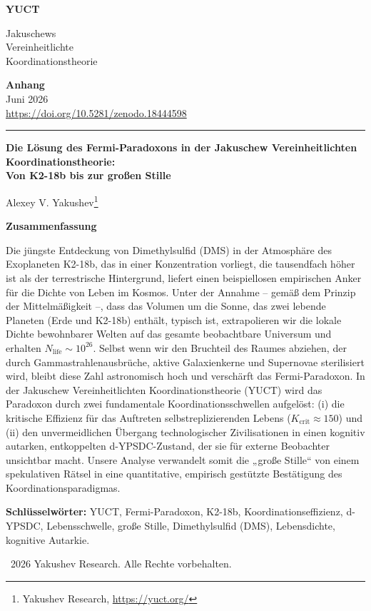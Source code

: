 \documentclass[11pt,a4paper]{article}
\newcommand{\makeheader}{%
	\noindent
	\begin{minipage}{0.17\textwidth}
		\raggedright
		{\sffamily\bfseries\color{skyblue}\fontsize{46}{46}\selectfont YUCT}%
	\end{minipage}%
	\hspace{30pt}
	\begin{minipage}{0.32\textwidth}
		\raggedright
		{\sffamily\fontsize{11}{13}\selectfont Jakuschews\\ Vereinheitlichte\\ Koordinationstheorie}%
	\end{minipage}%
	\hfill
	\begin{minipage}{0.38\textwidth}
		\raggedleft
		{\sffamily\bfseries Anhang}\\
		{\sffamily Juni 2026}\\
		{\sffamily\footnotesize \url{https://doi.org/10.5281/zenodo.18444598}}%
	\end{minipage}
	\par\vspace{5pt}
	\noindent\textcolor{gold}{\rule{\textwidth}{1.6pt}}
	\par\vspace{0pt}
}
\begin{document}
	\renewcommand{\thepage}{\arabic{page}}
	\thispagestyle{firstpage}
	\makeheader
	
	\vspace{0cm}
	{\LARGE\bfseries Die Lösung des Fermi-Paradoxons in der Jakuschew Vereinheitlichten Koordinationstheorie:\\ Von K2-18b bis zur großen Stille \par}
	\vspace{0.2cm}
	
	{\large Alexey V. Yakushev\footnote{Yakushev Research, \url{https://yuct.org/}}} \\
	\vspace{0.0cm}
	
	{\color{darkblue}\textbf{\LARGE Zusammenfassung}} \par
	{\large
		\noindent
		Die jüngste Entdeckung von Dimethylsulfid (DMS) in der Atmosphäre des Exoplaneten K2-18b, das in einer Konzentration vorliegt, die tausendfach höher ist als der terrestrische Hintergrund, liefert einen beispiellosen empirischen Anker für die Dichte von Leben im Kosmos. Unter der Annahme – gemäß dem Prinzip der Mittelmäßigkeit –, dass das Volumen um die Sonne, das zwei lebende Planeten (Erde und K2-18b) enthält, typisch ist, extrapolieren wir die lokale Dichte bewohnbarer Welten auf das gesamte beobachtbare Universum und erhalten \(N_{\mathrm{life}} \sim 10^{26}\). Selbst wenn wir den Bruchteil des Raumes abziehen, der durch Gammastrahlenausbrüche, aktive Galaxienkerne und Supernovae sterilisiert wird, bleibt diese Zahl astronomisch hoch und verschärft das Fermi-Paradoxon. In der Jakuschew Vereinheitlichten Koordinationstheorie (YUCT) wird das Paradoxon durch zwei fundamentale Koordinationsschwellen aufgelöst: (i) die kritische Effizienz für das Auftreten selbstreplizierenden Lebens (\(K_{\mathrm{crit}}\approx150\)) und (ii) den unvermeidlichen Übergang technologischer Zivilisationen in einen kognitiv autarken, entkoppelten d-YPSDC-Zustand, der sie für externe Beobachter unsichtbar macht. Unsere Analyse verwandelt somit die „große Stille“ von einem spekulativen Rätsel in eine quantitative, empirisch gestützte Bestätigung des Koordinationsparadigmas.
	}
	
	\vspace{0.1cm}
	\noindent
	{\color{darkblue}\textbf{Schlüsselwörter:}} YUCT, Fermi-Paradoxon, K2-18b, Koordinationseffizienz, d-YPSDC, Lebensschwelle, große Stille, Dimethylsulfid (DMS), Lebensdichte, kognitive Autarkie.
	
	\vspace{0.5cm}
	\noindent
	\textcopyright\ 2026 Yakushev Research. Alle Rechte vorbehalten.
	
\end{document}
